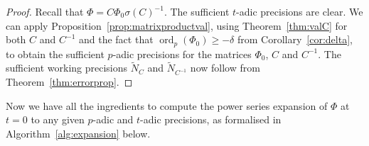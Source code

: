 \documentclass[a4paper,11pt]{article}
\numberwithin{equation}{section}
\DeclareMathOperator{\ord}{ord}          %
\theoremstyle{definition}
\begin{document}
\begin{proof}
Recall that $\Phi = C \Phi_0 \sigma(C)^{-1}$. The sufficient $t$-adic precisions are clear. 
We can apply Proposition~\ref{prop:matrixproductval}, using Theorem~\ref{thm:valC} for both $C$ and $C^{-1}$ 
and the fact that $\ord_p(\Phi_0) \geq -\delta$ from Corollary~\ref{cor:delta}, to obtain the sufficient $p$-adic 
precisions for the matrices $\Phi_0$, $C$ and $C^{-1}$. The sufficient working precisions $\tilde{N}_C$ and $\tilde{N}_{C^{-1}}$
now follow from Theorem~\ref{thm:errorprop}.
\end{proof}

Now we have all the ingredients to compute the power series expansion of $\Phi$ at $t=0$ to any 
given $p$-adic and $t$-adic precisions, as formalised in Algorithm~\ref{alg:expansion} below.
\end{document}
